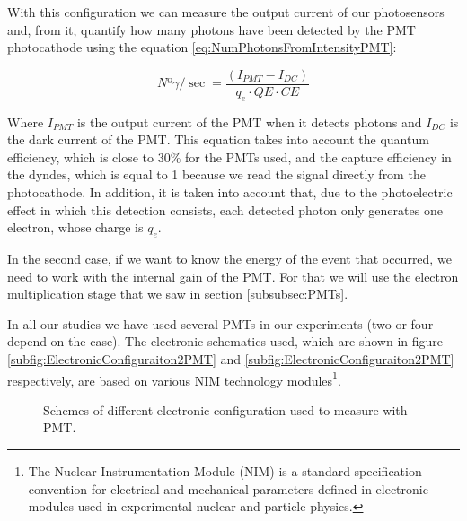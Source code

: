 With this configuration we can measure the output current of our photosensors and, from it, quantify how many photons have been detected by the PMT photocathode using the equation \ref{eq:NumPhotonsFromIntensityPMT}:

\begin{equation}
Nº\gamma/\sec = \frac{\left( I_{PMT} - I_{DC} \right)}{q_e \cdot{} QE \cdot{} CE}
\label{eq:NumPhotonsFromIntensityPMT}
\end{equation}

Where $I_{PMT}$ is the output current of the PMT when it detects photons and $I_{DC}$ is the dark current of the PMT. This equation takes into account the quantum efficiency, which is close to $30\%$ for the PMTs used, and the capture efficiency in the dyndes, which is equal to 1 because we read the signal directly from the photocathode. In addition, it is taken into account that, due to the photoelectric effect in which this detection consists, each detected photon only generates one electron, whose charge is $q_e$.

In the second case, if we want to know the energy of the event that occurred, we need to work with the internal gain of the PMT. For that we will use the electron multiplication stage that we saw in section \ref{subsubsec:PMTs}.

In all our studies we have used several PMTs in our experiments (two or four depend on the case). The electronic schematics used, which are shown in figure \ref{subfig:ElectronicConfiguraiton2PMT} and \ref{subfig:ElectronicConfiguraiton2PMT} respectively, are based on various NIM technology modules\footnote{The Nuclear Instrumentation Module (NIM) is a standard specification convention for electrical and mechanical parameters defined in electronic modules used in experimental nuclear and particle physics.}.

\begin{figure}[htbp]
 \centering
    \newline
 \caption{Schemes of different electronic configuration used to measure with PMT.}
 \label{fig:ElectronicConfiguraitonsPMT}
\end{figure}

